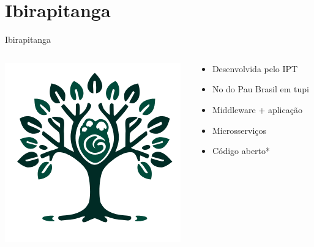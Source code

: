 \documentclass[aspectratio=169,xcolor=dvipsnames]{beamer}
\begin{document}
\section{Ibirapitanga}
\begin{frame}{Ibirapitanga}
  \begin{columns}
    \begin{column}{0.48\textwidth}
    \centering
    \includegraphics[width=.8\linewidth]{Figuras/logo-ibira.png}
    \end{column}
    \begin{column}{0.48\textwidth}
    \begin{itemize}
        \item Desenvolvida pelo IPT
        \item No do Pau Brasil em tupi
        \item Middleware + aplicação
        \item Microsserviços
        \item Código aberto*
    \end{itemize}
    \end{column}
  \end{columns}
\end{frame}
\end{document}
